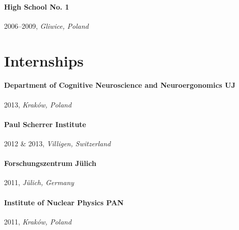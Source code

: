 \paragraph{High School No. 1} 2006--2009, \emph{Gliwice, Poland}\\









\section*{Internships}
\paragraph{Department of Cognitive Neuroscience and Neuroergonomics UJ} 2013, \emph{Kraków, Poland}
\paragraph{Paul Scherrer Institute} 2012 \& 2013, \emph{Villigen, Switzerland}
\paragraph{Forschungszentrum Jülich} 2011, \emph{Jülich, Germany}
\paragraph{Institute of Nuclear Physics PAN} 2011, \emph{Kraków, Poland}



\endgroup

